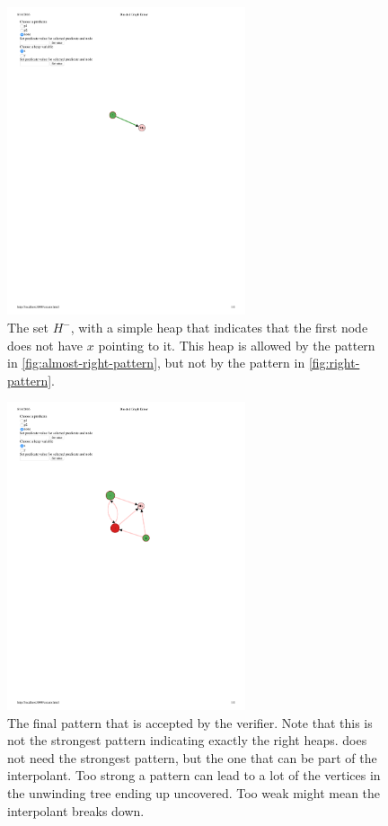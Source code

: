 \begin{figure}
  \centering
  \includegraphics[width=7cm]{fig/negative1.pdf}
  \caption{The set $H^{-}$, with a simple heap that indicates that the first node does not have $x$ pointing to it. This heap is allowed by the pattern in \autoref{fig:almost-right-pattern}, but not by the pattern in \autoref{fig:right-pattern}.}
  \label{fig:negative-example}
\end{figure}

\begin{figure}
  \centering
  \includegraphics[width=7cm]{fig/candidate6.pdf}
  \caption{The final pattern that is accepted by the verifier. Note that this is not the strongest pattern indicating exactly the right heaps. \verifier does not need the strongest pattern, but the one that can be part of the interpolant. Too strong a pattern can lead to a lot of the vertices in the unwinding tree ending up uncovered. Too weak might mean the interpolant breaks down.}
  \label{fig:right-pattern}
\end{figure}